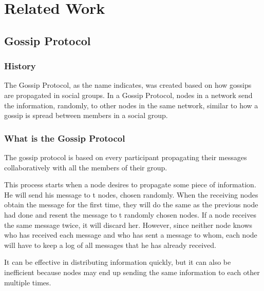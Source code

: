 
%

\chapter{Related Work}
\label{cha:related_work}

\section{Gossip Protocol}
\label{sec:gossip_protocol}

\subsection{History}
\quad The Gossip Protocol, as the name indicates, was created based on how gossips are
propagated in social groups. In a Gossip Protocol, nodes in a network send the information,
randomly, to other nodes in the same network, similar to how a gossip is spread between
members in a social group.


\subsection{What is the Gossip Protocol}
\quad The gossip protocol is based on every participant propagating their messages collaboratively
with all the members of their group.

This process starts when a node desires to propagate some piece of information. He will send
his message to t nodes, chosen randomly. When the receiving nodes obtain the message for the
first time, they will do the same as the previous node had done and resent the message to t
randomly chosen nodes. If a node receives the same message twice, it will discard her. However,
since neither node knows who has received each message and who has sent a message to whom, each
node will have to keep a log of all messages that he has already received.


It can be effective in distributing information quickly, but it can also be inefficient because
nodes may end up sending the same information to each other multiple times.



